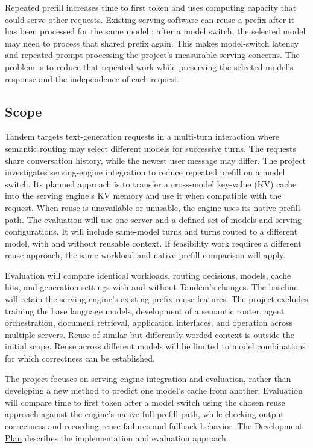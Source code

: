 \documentclass[11pt]{article}
\begin{document}
Repeated prefill increases time to first token and uses computing
capacity that could serve other requests. Existing serving software can
reuse a prefix after it has been processed for the same model
\cite{vLLMPrefixCaching}; after a model switch, the selected model may need
to process that shared prefix again. This makes model-switch latency and
repeated prompt processing the project's measurable serving concerns. The
problem is to reduce that repeated work while preserving the selected
model's response and the independence of each request.

\subsection{Scope}
\label{sec:scope}

Tandem targets text-generation requests in a multi-turn interaction where
semantic routing may select different models for successive turns. The
requests share conversation history, while the newest user message may
differ. The project investigates serving-engine integration to reduce
repeated prefill on a model switch. Its planned approach is to transfer a
cross-model key-value (KV) cache into the serving engine's KV memory and
use it when compatible with the request. When reuse is unavailable or
unusable, the engine uses its native prefill path. The evaluation will use
one server and a defined set of models and serving configurations. It will
include same-model turns and turns routed to a different model, with and
without reusable context. If feasibility work requires a different reuse
approach, the same workload and native-prefill comparison will apply.

Evaluation will compare identical workloads, routing decisions, models,
cache hits, and generation settings with and without Tandem's changes. The
baseline will retain the serving engine's existing prefix reuse features.
The project excludes training the base language models, development of a
semantic router, agent orchestration, document retrieval, application
interfaces, and operation across multiple servers. Reuse of similar but
differently worded context is outside the initial scope. Reuse across
different models will be limited to model combinations for which correctness
can be established.

The project focuses on serving-engine integration and evaluation, rather
than developing a new method to predict one model's cache from another.
Evaluation will compare time to first token after a model switch using the
chosen reuse approach against the engine's native full-prefill path, while
checking output correctness and recording reuse failures and fallback
behavior. The
\href{../DevelopmentPlan/DevelopmentPlan.pdf}{Development Plan} describes
the implementation and evaluation approach.
\end{document}
